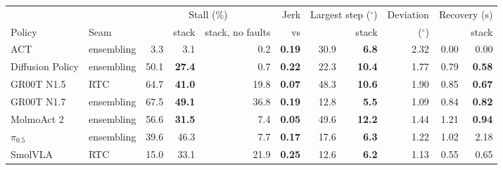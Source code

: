 \begin{tabular}{l l rrr r rr r rr}
\toprule
 & & \multicolumn{3}{c}{Stall (\%)} & Jerk & \multicolumn{2}{c}{Largest step ($^\circ$)} & Deviation & \multicolumn{2}{c}{Recovery (s)} \\
\cmidrule(lr){3-5}\cmidrule(lr){7-8}\cmidrule(lr){10-11}
Policy & Seam & \drtc{} & stack & stack, no faults & vs \drtc{} & \drtc{} & stack & ($^\circ$) & \drtc{} & stack \\
\midrule
ACT & ensembling & 3.3 & 3.1 & 0.2 & \textbf{0.19} & 30.9 & \textbf{6.8} & 2.32 & 0.00 & 0.00 \\
Diffusion Policy & ensembling & 50.1 & \textbf{27.4} & 0.7 & \textbf{0.22} & 22.3 & \textbf{10.4} & 1.77 & 0.79 & \textbf{0.58} \\
GR00T N1.5 & RTC & 64.7 & \textbf{41.0} & 19.8 & \textbf{0.07} & 48.3 & \textbf{10.6} & 1.90 & 0.85 & \textbf{0.67} \\
GR00T N1.7 & ensembling & 67.5 & \textbf{49.1} & 36.8 & \textbf{0.19} & 12.8 & \textbf{5.5} & 1.09 & 0.84 & \textbf{0.82} \\
MolmoAct 2 & ensembling & 56.6 & \textbf{31.5} & 7.4 & \textbf{0.05} & 49.6 & \textbf{12.2} & 1.44 & 1.21 & \textbf{0.94} \\
$\pi_{0.5}$ & ensembling & 39.6 & 46.3 & 7.7 & \textbf{0.17} & 17.6 & \textbf{6.3} & 1.22 & 1.02 & 2.18 \\
SmolVLA & RTC & 15.0 & 33.1 & 21.9 & \textbf{0.25} & 12.6 & \textbf{6.2} & 1.13 & 0.55 & 0.65 \\
\bottomrule
\end{tabular}
